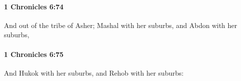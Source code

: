 		\paragraph{1 Chronicles 6:74} %
			\label{1CHRONICLES-6-74}

			And out of the tribe of Asher; Mashal with her suburbs, and Abdon with her suburbs,


		\paragraph{1 Chronicles 6:75} %
			\label{1CHRONICLES-6-75}

			And Hukok with her suburbs, and Rehob with her suburbs:


